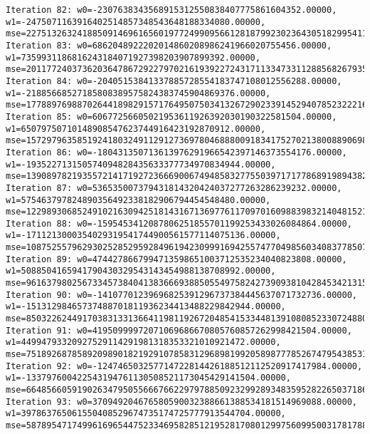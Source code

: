\documentclass[11pt]{article}
\begin{document}
\begin{Verbatim}[commandchars=\\\{\}]
Iteration 82: w0=-2307638343568915312550838407775861604352.00000, w1=-2475071163916402514857348543648188334080.00000, mse=22751326324188509146961656019772499095661281879923023643051829954111662985314304.00000
Iteration 83: w0=6862048922202014860208986241966020755456.00000, w1=7359931186816243184071927398203907899392.00000, mse=201177240373620364786729227970216193922724317113347331128856826793513583019819008.00000
Iteration 84: w0=-20405153841337885728554183747108012556288.00000, w1=-21885668527185808389575824383745904869376.00000, mse=1778897698870264418982915717649507503413267290233914529407852322216781660983132160.00000
Iteration 85: w0=60677256605021953611926392030190322581504.00000, w1=65079750710148908547623744916423192870912.00000, mse=15729796358519241803249112912736978046888009183417527021380088906986155274485628928.00000
Iteration 86: w0=-180431350713613976291966542397146373554176.00000, w1=-193522713150574094828435633377734970834944.00000, mse=139089782193557214171927236669006749485832775503971717786891989438259497043327188992.00000
Iteration 87: w0=536535007379431814320424037277263286239232.00000, w1=575463797824890356492338182906794454548480.00000, mse=1229893068524910216309425181431671369776117097016098839832140481521185865462408282112.00000
Iteration 88: w0=-1595453412087806251855701199253433026084864.00000, w1=-1711213000354029319541744900561577114075136.00000, mse=10875255796293025285295928496194230999169425574770498560340837785070741908995912499200.00000
Iteration 89: w0=4744278667994713598651003712535234040823808.00000, w1=5088504165941790430329543143454988138708992.00000, mse=96163798025673345738404138366693885055497582427390938104284534213158417744665050611712.00000
Iteration 90: w0=-14107701239696825391296737384445637071732736.00000, w1=-15131298465737488701811936234413488229842944.00000, mse=850322624491703831331366411981192672048541533448139108085233072488065918743388220293120.00000
Iteration 91: w0=41950999972071069686670805760857262998421504.00000, w1=44994793320927529114291981318353321010921472.00000, mse=7518926878589209890182192910785831296898199205898777852674795438531594733872808653225984.00000
Iteration 92: w0=-124746503257714722814426188512112520917417984.00000, w1=-133797600422543194761130508521173045429141504.00000, mse=66485660591902634795055666766229797885092329928934835952822650371861751685666357320351744.00000
Iteration 93: w0=370949204676580590032388661388534181514969088.00000, w1=397863765061550408529674735174725777913544704.00000, mse=587895471749961696544752334695828512195281708012997560995003178178814853013901715481559040.00000

\end{Verbatim}
\end{document}
